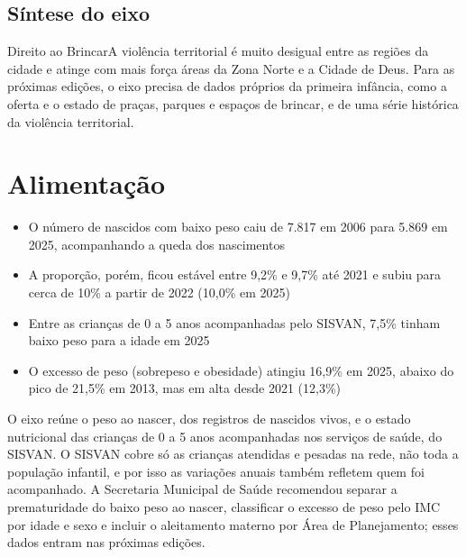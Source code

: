 
\section{Síntese do eixo}

\begin{sintese}{Direito ao Brincar}A violência territorial é muito desigual entre as regiões da cidade e atinge com mais força áreas da Zona Norte e a Cidade de Deus. Para as próximas edições, o eixo precisa de dados próprios da primeira infância, como a oferta e o estado de praças, parques e espaços de brincar, e de uma série histórica da violência territorial.\end{sintese}


\chapter{Alimentação}\label{cap:eixo-6}

\begin{achados}\begin{itemize}

\item O número de nascidos com baixo peso caiu de 7.817 em 2006 para 5.869 em 2025, acompanhando a queda dos nascimentos

\item A proporção, porém, ficou estável entre 9,2\% e 9,7\% até 2021 e subiu para cerca de 10\% a partir de 2022 (10,0\% em 2025)

\item Entre as crianças de 0 a 5 anos acompanhadas pelo SISVAN, 7,5\% tinham baixo peso para a idade em 2025

\item O excesso de peso (sobrepeso e obesidade) atingiu 16,9\% em 2025, abaixo do pico de 21,5\% em 2013, mas em alta desde 2021 (12,3\%)

\end{itemize}\end{achados}

O eixo reúne o peso ao nascer, dos registros de nascidos vivos, e o estado nutricional das crianças de 0 a 5 anos acompanhadas nos serviços de saúde, do SISVAN. O SISVAN cobre só as crianças atendidas e pesadas na rede, não toda a população infantil, e por isso as variações anuais também refletem quem foi acompanhado. A Secretaria Municipal de Saúde recomendou separar a prematuridade do baixo peso ao nascer, classificar o excesso de peso pelo IMC por idade e sexo e incluir o aleitamento materno por Área de Planejamento; esses dados entram nas próximas edições.

